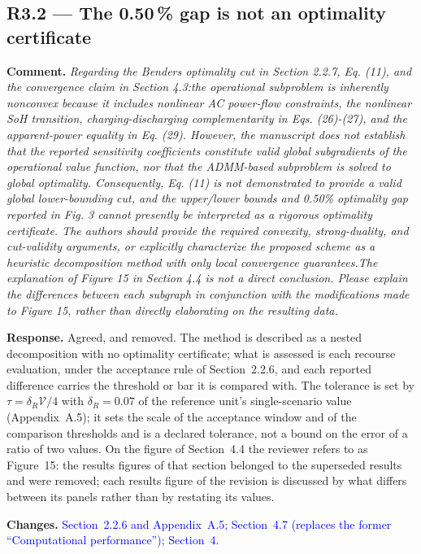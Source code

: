 \documentclass[11pt]{article}
\newcommand{\rcomment}[1]{\par\medskip\noindent\textbf{Comment.} \textit{#1}\par\smallskip}
\newcommand{\rresponse}[1]{\noindent\textbf{Response.} #1\par\smallskip}
\newcommand{\rchanges}[1]{\noindent\textbf{Changes.} \textcolor{blue}{#1}\par\medskip}
\begin{document}
\subsection*{R3.2 --- The 0.50\,\% gap is not an optimality certificate}
\rcomment{
Regarding the Benders optimality cut in Section 2.2.7, Eq. (11), and the convergence claim in Section 4.3:the operational subproblem is inherently nonconvex because it includes nonlinear AC power-flow constraints, the nonlinear SoH transition, charging-discharging complementarity in Eqs. (26)-(27), and the apparent-power equality in Eq. (29). However, the manuscript does not establish that the reported sensitivity coefficients constitute valid global subgradients of the operational value function, nor that the ADMM-based subproblem is solved to global optimality. Consequently, Eq. (11) is not demonstrated to provide a valid global lower-bounding cut, and the upper/lower bounds and 0.50\% optimality gap reported in Fig. 3 cannot presently be interpreted as a rigorous optimality certificate. The authors should provide the required convexity, strong-duality, and cut-validity arguments, or explicitly characterize the proposed scheme as a heuristic decomposition method with only local convergence guarantees.The explanation of Figure 15 in Section 4.4 is not a direct conclusion. Please explain the differences between each subgraph in conjunction with the modifications made to Figure 15, rather than directly elaborating on the resulting data.
}
\rresponse{Agreed, and removed. The method is described as a nested decomposition with no optimality
certificate; what is assessed is each recourse evaluation, under the acceptance rule of Section~2.2.6, and each reported difference carries the
threshold or bar it is compared with. The tolerance is set by
$\tau = \delta_R \mathcal{V}/4$ with $\delta_R = 0.07$ of the reference unit's single-scenario value (Appendix~A.5); it sets the scale of the acceptance window and of the comparison thresholds and is a declared tolerance, not a bound on the error of a ratio
of two values. On the figure of Section~4.4 the reviewer refers to as Figure~15: the results figures of that section
belonged to the superseded results and were removed; each results figure of the revision is discussed by
what differs between its panels rather than by restating its values.}
\rchanges{Section~2.2.6 and Appendix~A.5; Section~4.7 (replaces the former ``Computational performance''); Section~4.}
\end{document}
